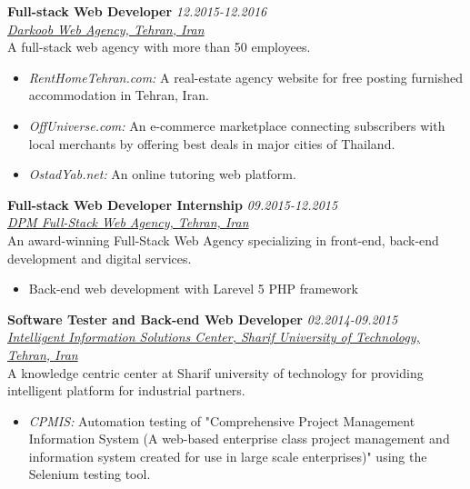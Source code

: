 \documentclass[9pt]{article}
\newenvironment{changemargin}[2]{%
  \begin{list}{}{%
    \setlength{\topsep}{0pt}%
    \setlength{\leftmargin}{#1}%
    \setlength{\rightmargin}{#2}%
    \setlength{\listparindent}{\parindent}%
    \setlength{\itemindent}{\parindent}%
    \setlength{\parsep}{\parskip}%
  }%
  \item[]}{\end{list}
}
\newenvironment{body} {
	\vspace*{-16pt}
	\begin{changemargin}{-0.25in}{-0.5in}
  }	
	{\end{changemargin}
}
\begin{document}
\begin{body}
	\vspace{5pt}

	\textbf{Full-stack Web Developer} \hfill \emph{12.2015-12.2016} \\
	\href{http://sitedar.com/en/}{\emph{Darkoob Web Agency, Tehran, Iran}}\\
	A full-stack web agency with more than 50 employees.\\

	\begin{itemize}
		\item \emph{RentHomeTehran.com:} A real-estate agency website for free posting furnished accommodation in Tehran, Iran.
		\item \emph{OffUniverse.com:} An e-commerce marketplace connecting subscribers with local merchants by offering best deals in major cities of Thailand.
		\item \emph{OstadYab.net:} An online tutoring web platform.
	\end{itemize}

	\vspace{5pt}

	\textbf{Full-stack Web Developer Internship} \hfill \emph{09.2015-12.2015} \\
	\href{https://dpm.co.com/}{\emph{DPM Full-Stack Web Agency, Tehran, Iran}}\\
	An award-winning Full-Stack Web Agency specializing in front-end, back-end development and digital services.
	\begin{itemize}
		\item Back-end web development with Larevel 5 PHP framework
	\end{itemize}
	\vspace{5pt}

	\textbf{Software Tester and Back-end Web Developer } \hfill \emph{02.2014-09.2015} \\
	\href{http://iiscenter.ir/en/}{\emph{Intelligent Information Solutions Center, Sharif University of Technology, Tehran, Iran}}\\
	A knowledge centric center at Sharif university of technology for providing intelligent platform for industrial partners.
	\begin{itemize}
		\item \emph{CPMIS:} Automation testing of "{Comprehensive Project Management Information System (A web-based enterprise class project management and information system created for use in large scale enterprises)}" using the Selenium testing tool.


\end{itemize}
\end{body}
\end{document}
